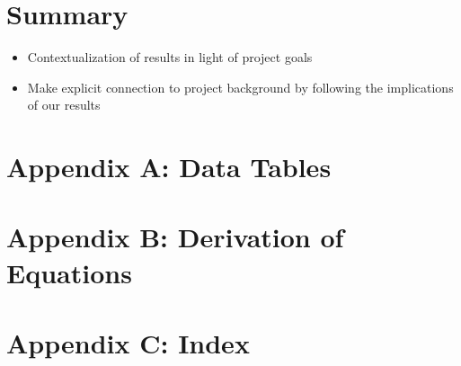 \documentclass[12pt, conference]{IEEEtran}
\begin{document}
\section{Summary}
\begin{itemize}
  \item Contextualization of results in light of project goals
  \item Make explicit connection to project background by following the implications of our results
\end{itemize}




\begin{thebibliography}{00}
\end{thebibliography}
\vspace{12pt}



\section*{Appendix A: Data Tables}


\section*{Appendix B: Derivation of Equations}


\section*{Appendix C: Index}
\end{document}
